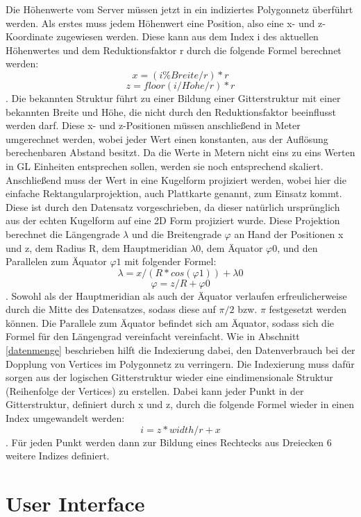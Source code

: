 Die Höhenwerte vom Server müssen jetzt in ein indiziertes Polygonnetz überführt werden. Als erstes muss jedem Höhenwert eine Position, also eine x- und z-Koordinate zugewiesen werden. Diese kann aus dem Index i des aktuellen Höhenwertes und dem Reduktionsfaktor r durch die folgende Formel berechnet werden: \[x = (i \% Breite / r) * r\] \[z = floor(i / H\ddot{o}he / r) * r\]. 
Die bekannten Struktur führt zu einer Bildung einer Gitterstruktur mit einer bekannten Breite und Höhe, die nicht durch den Reduktionsfaktor beeinflusst werden darf. Diese x- und z-Positionen müssen anschließend in Meter umgerechnet werden, wobei jeder Wert einen konstanten, aus der Auflösung berechenbaren Abstand besitzt. Da die Werte in Metern nicht eins zu eins Werten in GL Einheiten entsprechen sollen, werden sie noch entsprechend skaliert. Anschließend muss der Wert in eine Kugelform projiziert werden, wobei hier die einfache Rektangularprojektion, auch Plattkarte genannt, zum Einsatz kommt. Diese ist durch den Datensatz vorgeschrieben, da dieser natürlich ursprünglich aus der echten Kugelform auf eine 2D Form projiziert wurde. Diese Projektion berechnet die Längengrade $\lambda$ und die Breitengrade $\varphi$ an Hand der Positionen x und z, dem Radius R, dem Hauptmeridian $\lambda0$, dem Äquator $\varphi0$, und den Parallelen zum Äquator $\varphi1$ mit folgender Formel: \[\lambda = x / (R * cos(\varphi1)) + \lambda0\] \[\varphi = z / R + \varphi0\].
Sowohl als der Hauptmeridian als auch der Äquator verlaufen erfreulicherweise durch die Mitte des Datensatzes, sodass diese auf $\pi / 2$ bzw. $\pi$ festgesetzt werden können. Die Parallele zum Äquator befindet sich am Äquator, sodass sich die Formel für den Längengrad vereinfacht vereinfacht. Wie in Abschnitt \ref{datenmenge} beschrieben hilft die Indexierung dabei, den Datenverbrauch bei der Dopplung von Vertices im Polygonnetz zu verringern. Die Indexierung muss dafür sorgen aus der logischen Gitterstruktur wieder eine eindimensionale Struktur (Reihenfolge der Vertices) zu erstellen. Dabei kann jeder Punkt in der Gitterstruktur, definiert durch x und z, durch die folgende Formel wieder in einen Index umgewandelt werden: \[i = z * width / r + x\]. Für jeden Punkt werden dann zur Bildung eines Rechtecks aus Dreiecken 6 weitere Indizes definiert.

\section{User Interface}


